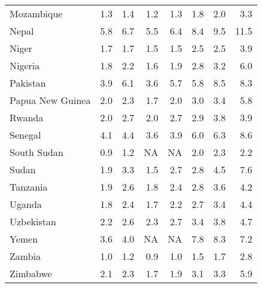 \begin{table}[b]
{\begin{tabular}[t]{lrrrrrrr}
Mozambique & 1.3 & 1.4 & 1.2 & 1.3 & 1.8 & 2.0 & 3.3\\
Nepal & 5.8 & 6.7 & 5.5 & 6.4 & 8.4 & 9.5 & 11.5\\
Niger & 1.7 & 1.7 & 1.5 & 1.5 & 2.5 & 2.5 & 3.9\\
Nigeria & 1.8 & 2.2 & 1.6 & 1.9 & 2.8 & 3.2 & 6.0\\
Pakistan & 3.9 & 6.1 & 3.6 & 5.7 & 5.8 & 8.5 & 8.3\\
Papua New Guinea & 2.0 & 2.3 & 1.7 & 2.0 & 3.0 & 3.4 & 5.8\\
Rwanda & 2.0 & 2.7 & 2.0 & 2.7 & 2.9 & 3.8 & 3.9\\
Senegal & 4.1 & 4.4 & 3.6 & 3.9 & 6.0 & 6.3 & 8.6\\
South Sudan & 0.9 & 1.2 & NA & NA & 2.0 & 2.3 & 2.2\\
Sudan & 1.9 & 3.3 & 1.5 & 2.7 & 2.8 & 4.5 & 7.6\\
Tanzania & 1.9 & 2.6 & 1.8 & 2.4 & 2.8 & 3.6 & 4.2\\
Uganda & 1.8 & 2.4 & 1.7 & 2.2 & 2.7 & 3.4 & 4.4\\
Uzbekistan & 2.2 & 2.6 & 2.3 & 2.7 & 3.4 & 3.8 & 4.7\\
Yemen & 3.6 & 4.0 & NA & NA & 7.8 & 8.3 & 7.2\\
Zambia & 1.0 & 1.2 & 0.9 & 1.0 & 1.5 & 1.7 & 2.8\\
Zimbabwe & 2.1 & 2.3 & 1.7 & 1.9 & 3.1 & 3.3 & 5.9\\
\bottomrule
\end{tabular}}
\end{table}